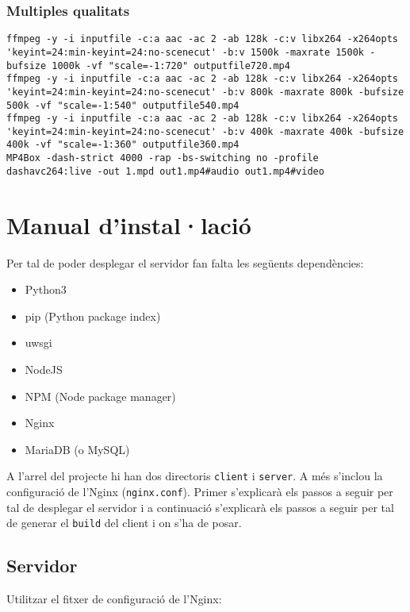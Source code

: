 \documentclass[12pt, titlepage]{article}
\begin{document}
\subsubsection{Multiples qualitats}
\begin{lstlisting}[breaklines]
ffmpeg -y -i inputfile -c:a aac -ac 2 -ab 128k -c:v libx264 -x264opts 'keyint=24:min-keyint=24:no-scenecut' -b:v 1500k -maxrate 1500k -bufsize 1000k -vf "scale=-1:720" outputfile720.mp4
ffmpeg -y -i inputfile -c:a aac -ac 2 -ab 128k -c:v libx264 -x264opts 'keyint=24:min-keyint=24:no-scenecut' -b:v 800k -maxrate 800k -bufsize 500k -vf "scale=-1:540" outputfile540.mp4
ffmpeg -y -i inputfile -c:a aac -ac 2 -ab 128k -c:v libx264 -x264opts 'keyint=24:min-keyint=24:no-scenecut' -b:v 400k -maxrate 400k -bufsize 400k -vf "scale=-1:360" outputfile360.mp4
MP4Box -dash-strict 4000 -rap -bs-switching no -profile dashavc264:live -out 1.mpd out1.mp4#audio out1.mp4#video
\end{lstlisting}


\section{Manual d'instal·lació}

Per tal de poder desplegar el servidor fan falta les següents dependències:

\begin{itemize}
\item Python3
\item pip (Python package index)
\item uwsgi
\item NodeJS
\item NPM (Node package manager)
\item Nginx
\item MariaDB (o MySQL)
\end{itemize}

A l'arrel del projecte hi han dos directoris \verb|client| i \verb|server|. A més
s'inclou la configuració de l'Nginx (\verb|nginx.conf|). Primer s'explicarà els
passos a seguir per tal de desplegar el servidor i a continuació s'explicarà els
passos a seguir per tal de generar el \verb|build| del client i on s'ha de posar.

\subsection{Servidor}

Utilitzar el fitxer de configuració de l'Nginx:
\end{document}

